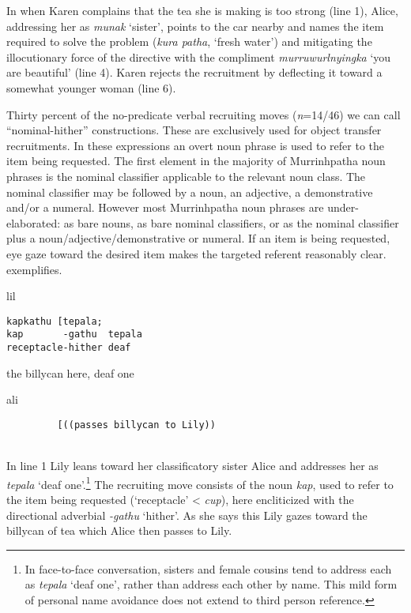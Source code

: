 \documentclass[output=paper,nonflat,colorlinks,citecolor=brown]{langsci/langscibook}
\begin{document}
In  when Karen complains that the tea she is making is too strong (line 1), Alice, addressing her as \textit{munak} ‘sister’, points to the car nearby and names the item required to solve the problem (\textit{kura patha}, ‘fresh water’) and mitigating the illocutionary force of the directive with the compliment \textit{murruwurlnyingka} ‘you are beautiful’ (line 4). Karen rejects the recruitment by deflecting it toward a somewhat younger woman (line 6).

Thirty percent of the no-predicate verbal recruiting moves (\textit{n}=14/46) we can call “nominal-hither” constructions. These are exclusively used for object transfer recruitments. In these expressions an overt noun phrase is used to refer to the item being requested. The first element in the majority of Murrinhpatha noun phrases is the nominal classifier applicable to the relevant noun class. The nominal classifier may be followed by a noun, an adjective, a demonstrative and/or a numeral. However most Murrinhpatha noun phrases are under-elaborated: as bare nouns, as bare nominal classifiers, or as the nominal classifier plus a noun/adjective/demonstrative or numeral. If an item is being requested, eye gaze toward the desired item makes the targeted referent reasonably clear.  exemplifies.

\vspace{2mm}
%
\begin{transbox}{1}{lil}
\begin{verbatim}
kapkathu [tepala;
kap       -gathu  tepala
receptacle-hither deaf
\end{verbatim}
the billycan here, deaf one
\end{transbox}
%
\begin{transbox}{2}{ali}
\begin{verbatim}
         [((passes billycan to Lily))
\end{verbatim}
\end{transbox}\\

In line 1 Lily leans toward her classificatory sister Alice and addresses her as \textit{tepala} ‘deaf one’.\footnote{In face-to-face conversation, sisters and female cousins tend to address each as \textit{tepala} ‘deaf one’, rather than address each other by name. This mild form of personal name avoidance does not extend to third person reference.} The recruiting move consists of the noun \textit{kap}, used to refer to the item being requested (‘receptacle’ < \textit{cup}), here encliticized with the directional adverbial \textit{-gathu} ‘hither’. As she says this Lily gazes toward the billycan of tea which Alice then passes to Lily.
\end{document}
